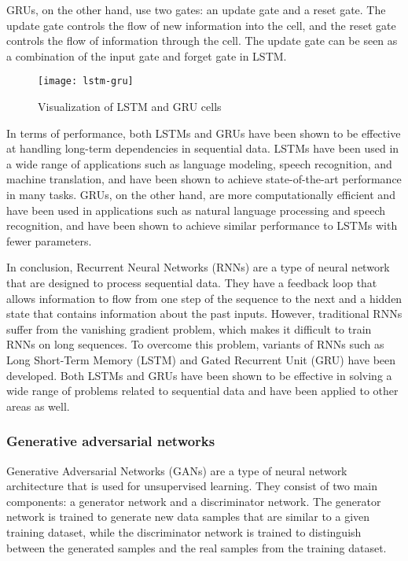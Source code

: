 GRUs, on the other hand, use two gates: an update gate and a reset gate.
The update gate controls the flow of new information into the cell, and the reset gate controls the flow of information through the cell.
The update gate can be seen as a combination of the input gate and forget gate in LSTM.

\begin{figure}[ht]
  \centering
  \texttt{[image: lstm-gru]}
  \caption{Visualization of LSTM and GRU cells \cite{phi}}
\end{figure}

In terms of performance, both LSTMs and GRUs have been shown to be effective at handling long-term dependencies in sequential data.
LSTMs have been used in a wide range of applications such as language modeling, speech recognition, and machine translation, and have been shown to achieve state-of-the-art performance in many tasks.
GRUs, on the other hand, are more computationally efficient and have been used in applications such as natural language processing and speech recognition, and have been shown to achieve similar performance to LSTMs with fewer parameters.

In conclusion, Recurrent Neural Networks (RNNs) are a type of neural network that are designed to process sequential data.
They have a feedback loop that allows information to flow from one step of the sequence to the next and a hidden state that contains information about the past inputs.
However, traditional RNNs suffer from the vanishing gradient problem, which makes it difficult to train RNNs on long sequences.
To overcome this problem, variants of RNNs such as Long Short-Term Memory (LSTM) and Gated Recurrent Unit (GRU) have been developed. Both LSTMs and GRUs have been shown to be effective in solving a wide range of problems related to sequential data and have been applied to other areas as well.

\subsubsection{Generative adversarial networks}
Generative Adversarial Networks (GANs) are a type of neural network architecture that is used for unsupervised learning.
They consist of two main components: a generator network and a discriminator network.
The generator network is trained to generate new data samples that are similar to a given training dataset, while the discriminator network is trained to distinguish between the generated samples and the real samples from the training dataset.

